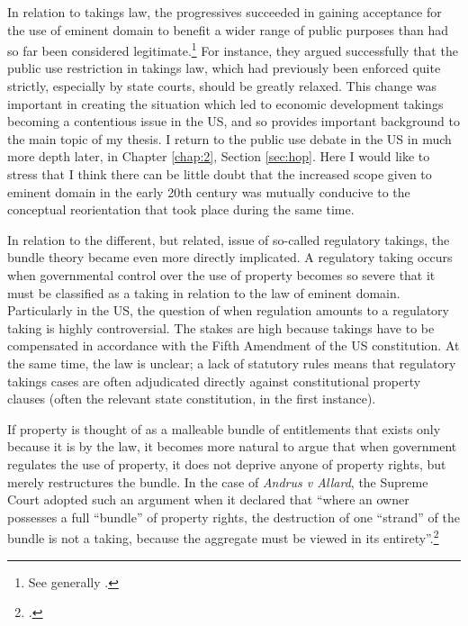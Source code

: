 In relation to takings law, the progressives succeeded in gaining acceptance for the use of eminent domain to benefit a wider range of public purposes than had so far been considered legitimate.\footnote{See generally \cite{yale49}.} For instance, they argued successfully that the public use restriction in takings law, which had previously been enforced quite strictly, especially by state courts, should be greatly relaxed. This change was important in creating the situation which led to economic development takings becoming a contentious issue in the US, and so provides important background to the main topic of my thesis. I return to the public use debate in the US in much more depth later, in Chapter \ref{chap:2}, Section \ref{sec:hop}. Here I would like to stress that I think there can be little doubt that the increased scope given to eminent domain in the early 20th century was mutually conducive to the conceptual reorientation that took place during the same time.

In relation to the different, but related, issue of so-called regulatory takings, the bundle theory became even more directly implicated. A regulatory taking occurs when governmental control over the use of property becomes so severe that it must be classified as a taking in relation to the law of eminent domain. Particularly in the US, the question of when regulation amounts to a regulatory taking is highly controversial. The stakes are high because takings have to be compensated in accordance with the Fifth Amendment of the US constitution. At the same time, the law is unclear; a lack of statutory rules means that regulatory takings cases are often adjudicated directly against constitutional property clauses (often the relevant state constitution, in the first instance).

If property is thought of as a malleable bundle of entitlements that exists only because it is  by the law, it becomes more natural to argue that when government regulates the use of property, it does not deprive anyone of property rights, but merely restructures the bundle. In the case of {\it Andrus v Allard}, the Supreme Court adopted such an argument when it declared that ``where an owner possesses a full ``bundle'' of property rights, the destruction of one ``strand'' of the bundle is not a taking, because the aggregate must be viewed in its entirety''.\footcite[65--66]{andrus79}

